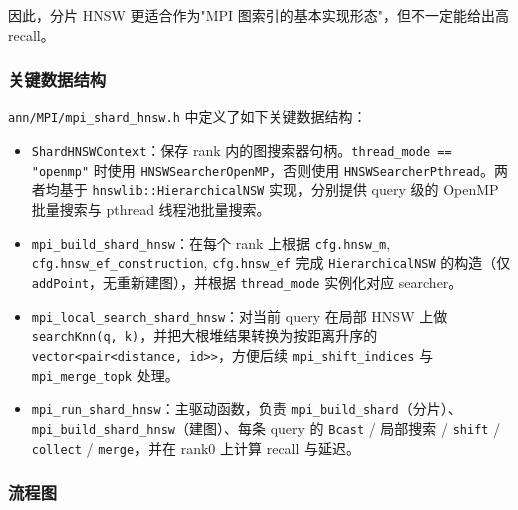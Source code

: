 \documentclass[a4paper]{article}
\begin{document}
因此，分片 HNSW 更适合作为"MPI 图索引的基本实现形态"，但不一定能给出高 recall。

\subsubsection{关键数据结构}

\texttt{ann/MPI/mpi\_shard\_hnsw.h} 中定义了如下关键数据结构：

\begin{itemize}
    \item \texttt{ShardHNSWContext}：保存 rank 内的图搜索器句柄。\texttt{thread\_mode == "openmp"} 时使用 \texttt{HNSWSearcherOpenMP}，否则使用 \texttt{HNSWSearcherPthread}。两者均基于 \texttt{hnswlib::HierarchicalNSW} 实现，分别提供 query 级的 OpenMP 批量搜索与 pthread 线程池批量搜索。
    \item \texttt{mpi\_build\_shard\_hnsw}：在每个 rank 上根据 \texttt{cfg.hnsw\_m}, \texttt{cfg.hnsw\_ef\_construction}, \texttt{cfg.hnsw\_ef} 完成 \texttt{HierarchicalNSW} 的构造（仅 \texttt{addPoint}，无重新建图），并根据 \texttt{thread\_mode} 实例化对应 searcher。
    \item \texttt{mpi\_local\_search\_shard\_hnsw}：对当前 query 在局部 HNSW 上做 \texttt{searchKnn(q, k)}，并把大根堆结果转换为按距离升序的 \texttt{vector<pair<distance, id>>}，方便后续 \texttt{mpi\_shift\_indices} 与 \texttt{mpi\_merge\_topk} 处理。
    \item \texttt{mpi\_run\_shard\_hnsw}：主驱动函数，负责 \texttt{mpi\_build\_shard}（分片）、\texttt{mpi\_build\_shard\_hnsw}（建图）、每条 query 的 \texttt{Bcast} / 局部搜索 / \texttt{shift} / \texttt{collect} / \texttt{merge}，并在 rank0 上计算 recall 与延迟。
\end{itemize}

\subsubsection{流程图}
\end{document}
